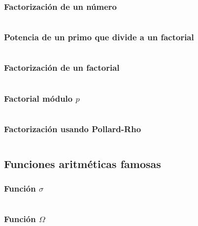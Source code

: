\documentclass[11pt]{article}
\begin{document}
			\subsubsection{Factorización de un número}
			\inputminted[tabsize=2,breaklines,firstline=194,lastline=207,fontsize=\small]{c++}{numberTheory.cpp}
			
			\subsubsection{Potencia de un primo que divide a un factorial}
			\inputminted[tabsize=2,breaklines,firstline=418,lastline=422,fontsize=\small]{c++}{numberTheory.cpp}
			
			\subsubsection{Factorización de un factorial}
			\inputminted[tabsize=2,breaklines,firstline=424,lastline=431,fontsize=\small]{c++}{numberTheory.cpp}
			
			\subsubsection{Factorial módulo $p$}
			\inputminted[tabsize=2,breaklines,firstline=1024,lastline=1039,fontsize=\small]{c++}{numberTheory.cpp}
			
			\subsubsection{Factorización usando Pollard-Rho}
			\inputminted[tabsize=2,breaklines,firstline=657,lastline=709,fontsize=\small]{c++}{numberTheory.cpp}
		
		\subsection{Funciones aritméticas famosas}
			\subsubsection{Función $\sigma$}
			\inputminted[tabsize=2,breaklines,firstline=209,lastline=226,fontsize=\small]{c++}{numberTheory.cpp}
			
			\subsubsection{Función $\Omega$}
			\inputminted[tabsize=2,breaklines,firstline=228,lastline=235,fontsize=\small]{c++}{numberTheory.cpp}
			
\end{document}
